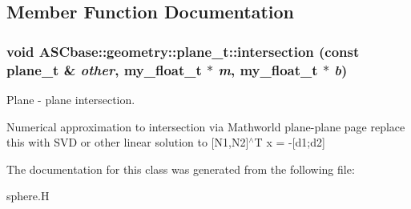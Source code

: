 \subsection{Member Function Documentation}
\subsubsection{\setlength{\rightskip}{0pt plus 5cm}void ASCbase::geometry::plane\_\-t::intersection (const \bf{plane\_\-t} \& {\em other}, my\_\-float\_\-t $\ast$ {\em m}, my\_\-float\_\-t $\ast$ {\em b})\hspace{0.3cm}{\tt  [inline]}}\label{classASCbase_1_1geometry_1_1plane__t_aad5de4249d5e30464f69e0280f62fd3}


Plane - plane intersection. 

Numerical approximation to intersection via Mathworld plane-plane page replace this with SVD or other linear solution to [N1,N2]$^\wedge$T x = -[d1;d2] 

The documentation for this class was generated from the following file:\begin{CompactItemize}
\item 
sphere.H\end{CompactItemize}
